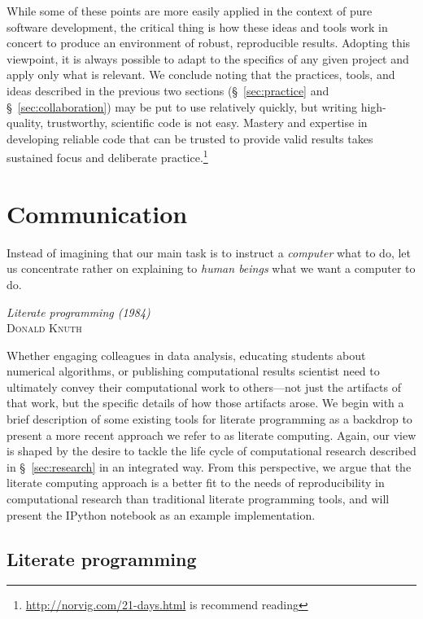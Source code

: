 \documentclass[ChapterTOCs,krantz2]{krantz} %
\begin{document}
While some of these points are more easily applied in the context of pure
software development, the critical thing is how these ideas and tools work in
concert to produce an environment of robust, reproducible results.  Adopting
this viewpoint, it is always possible to adapt to the specifics of any given
project and apply only what is relevant. We conclude noting that the practices,
tools, and ideas described in the previous two sections (§~\ref{sec:practice}
and §~\ref{sec:collaboration}) may be put to use relatively quickly, but
writing high-quality, trustworthy, scientific code is not easy. Mastery and
expertise in developing reliable code that can be trusted to provide valid
results takes sustained focus and deliberate
practice.\footnote{\url{http://norvig.com/21-days.html} is recommend reading}

\section{\label{sec:communication}Communication}

\setlength{\epigraphrule}{0pt}
\setlength{\epigraphwidth}{.90\textwidth}
\epigraph%
{%
Instead of imagining that our main task is to instruct a \emph{computer}
what to do, let us concentrate rather on explaining to \emph{human beings}
what we want a computer to do.
}%
{\textit{Literate programming (1984)}\\ \textsc{Donald Knuth} }

Whether engaging colleagues in data analysis, educating students about
numerical algorithms, or publishing computational results scientist need to
ultimately convey their computational work to others---not just the artifacts
of that work, but the specific details of how those artifacts arose.  We begin
with a brief description of some existing tools for literate programming as a
backdrop to present a more recent approach we refer to as literate computing.
Again, our view is shaped by the desire to tackle the life cycle of
computational research described in §~\ref{sec:research} in an integrated way.
From this perspective, we argue that the literate computing approach is a
better fit to the needs of reproducibility in computational research than
traditional literate programming tools, and will present the IPython notebook
as an example implementation.

\subsection{Literate programming}
\end{document}
